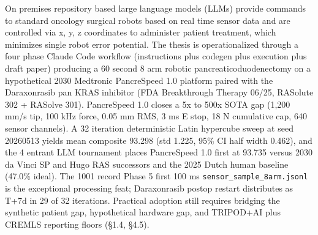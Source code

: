 
On premises repository based large language models (LLMs) provide commands to standard oncology surgical robots based on real time sensor data and are controlled via x, y, z coordinates to administer patient treatment, which minimizes single robot error potential. The thesis is operationalized through a four phase Claude Code workflow (instructions plus codegen plus execution plus draft paper) producing a 60 second 8 arm robotic pancreaticoduodenectomy on a hypothetical 2030 Medtronic PancreSpeed 1.0 platform paired with the Daraxonrasib pan KRAS inhibitor (FDA Breakthrough Therapy 06/25, RASolute 302 + RASolve 301). PancreSpeed 1.0 closes a 5x to 500x SOTA gap (1,200 mm/s tip, 100 kHz force, 0.05 mm RMS, 3 ms E stop, 18 N cumulative cap, 640 sensor channels). A 32 iteration deterministic Latin hypercube sweep at seed 20260513 yields mean composite 93.298 (std 1.225, 95\% CI half width 0.462), and the 4 entrant LLM tournament places PancreSpeed 1.0 first at 93.735 versus 2030 da Vinci SP and Hugo RAS successors and the 2025 Dutch human baseline (47.0\% ideal). The 1001 record Phase 5 first 100 ms \texttt{sensor\_sample\_8arm.jsonl} is the exceptional processing feat; Daraxonrasib postop restart distributes as T+7d in 29 of 32 iterations. Practical adoption still requires bridging the synthetic patient gap, hypothetical hardware gap, and TRIPOD+AI plus CREMLS reporting floors (\S 1.4, \S 4.5).
